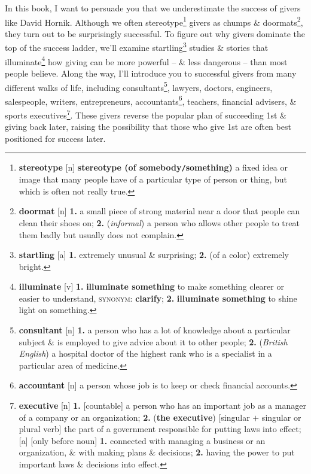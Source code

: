 \documentclass[oneside]{book}
\numberwithin{equation}{section}
\begin{document}
In this book, I want to persuade you that we underestimate the success of givers like David Hornik. Although we often stereotype\footnote{\textbf{stereotype} [n] \textbf{stereotype (of somebody\texttt{/}something)} a fixed idea or image that many people have of a particular type of person or thing, but which is often not really true.} givers as chumps \& doormats\footnote{\textbf{doormat} [n] \textbf{1.} a small piece of strong material near a door that people can clean their shoes on; \textbf{2.} (\textit{informal}) a person who allows other people to treat them badly but usually does not complain.}, they turn out to be surprisingly successful. To figure out why givers dominate the top of the success ladder, we'll examine startling\footnote{\textbf{startling} [a] \textbf{1.} extremely unusual \& surprising; \textbf{2.} (of a color) extremely bright.} studies \& stories that illuminate\footnote{\textbf{illuminate} [v] \textbf{1.} \textbf{illuminate something} to make something clearer or easier to understand, \textsc{synonym}: \textbf{clarify}; \textbf{2.} \textbf{illuminate something} to shine light on something.} how giving can be more powerful -- \& less dangerous -- than most people believe. Along the way, I'll introduce you to successful givers from many different walks of life, including consultants\footnote{\textbf{consultant} [n] \textbf{1.} a person who has a lot of knowledge about a particular subject \& is employed to give advice about it to other people; \textbf{2.} (\textit{British English}) a hospital doctor of the highest rank who is a specialist in a particular area of medicine.}, lawyers, doctors, engineers, salespeople, writers, entrepreneurs, accountants\footnote{\textbf{accountant} [n] a person whose job is to keep or check financial accounts.}, teachers, financial advisers, \& sports executives\footnote{\textbf{executive} [n] \textbf{1.} [countable] a person who has an important job as a manager of a company or an organization; \textbf{2.} (\textbf{the executive}) [singular $+$ singular or plural verb] the part of a government responsible for putting laws into effect; [a] [only before noun] \textbf{1.} connected with managing a business or an organization, \& with making plans \& decisions; \textbf{2.} having the power to put important laws \& decisions into effect.}. These givers reverse the popular plan of succeeding 1st \& giving back later, raising the possibility that those who give 1st are often best positioned for success later.
\end{document}
